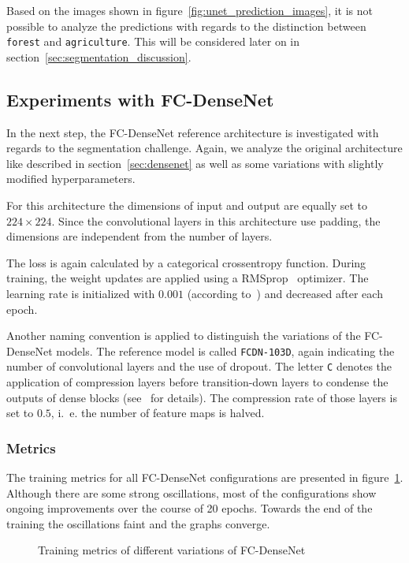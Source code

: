 Based on the images shown in figure~\ref{fig:unet_prediction_images}, it is not possible to analyze the predictions with regards to the distinction between \texttt{forest} and \texttt{agriculture}. This will be considered later on in section~\ref{sec:segmentation_discussion}.

\subsection{Experiments with FC-DenseNet}
\label{sec:densenet_experiments}
In the next step, the FC-DenseNet reference architecture is investigated with regards to the segmentation challenge. Again, we analyze the original architecture like described in section~\ref{sec:densenet} as well as some variations with slightly modified hyperparameters.

For this architecture the dimensions of input and output are equally set to $224\times 224$. Since the convolutional layers in this architecture use padding, the dimensions are independent from the number of layers.

The loss is again calculated by a categorical crossentropy function. During training, the weight updates are applied using a RMSprop~\cite{rmsprop14} optimizer. The learning rate is initialized with $0.001$ (according to~\cite{denseseg17}) and decreased after each epoch.

Another naming convention is applied to distinguish the variations of the FC-DenseNet models. The reference model is called \texttt{FCDN-103D}, again indicating the number of convolutional layers and the use of dropout. The letter \texttt{C} denotes the application of compression layers before transition-down layers to condense the outputs of dense blocks (see~\cite{denseseg17} for details). The compression rate of those layers is set to $0.5$, i.~e. the number of feature maps is halved.

\subsubsection{Metrics}
The training metrics for all FC-DenseNet configurations are presented in figure~\ref{fig:densenet_train_metrics}. Although there are some strong oscillations, most of the configurations show ongoing improvements over the course of 20 epochs. Towards the end of the training the oscillations faint and the graphs converge.

\begin{figure}
    \newcommand{\DensenetMetricsImageWidth}{0.32\textwidth}
    \centering
            
    \caption{Training metrics of different variations of FC-DenseNet}
    \label{fig:densenet_train_metrics}
\end{figure}

